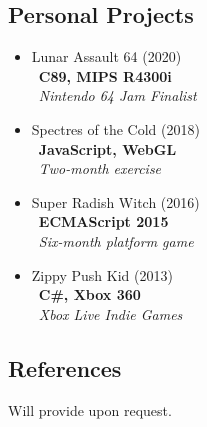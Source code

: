 \documentclass{article}
\begin{document}
\begin{multicols*}{2}
\begin{multicols*}{2}
\end{multicols*}

\subsection*{Personal Projects}
\begin{itemize}
  \item Lunar Assault 64 (2020) \\\ \textbf{C89, MIPS R4300i} \\\ \textit{Nintendo 64 Jam Finalist}
  \item Spectres of the Cold (2018) \\\ \textbf{JavaScript, WebGL} \\\ \textit{Two-month exercise}
  \item Super Radish Witch (2016) \\\ \textbf{ECMAScript 2015} \\\ \textit{Six-month platform game}
  \item Zippy Push Kid (2013) \\\ \textbf{C\#, Xbox 360} \\\ \textit{Xbox Live Indie Games}
\end{itemize}

\subsection*{References}
Will provide upon request.

\end{multicols*}
\end{document}
